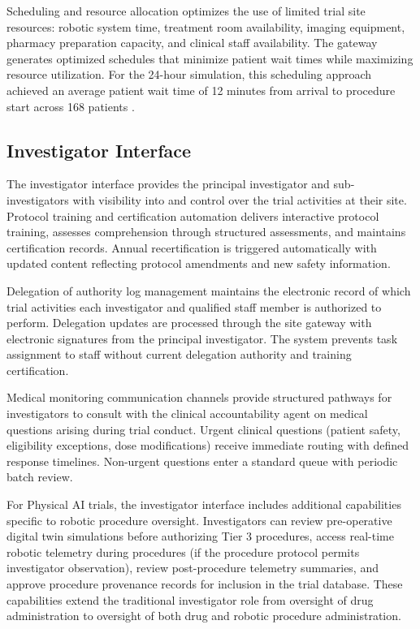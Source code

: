 Scheduling and resource allocation optimizes the use of limited trial site resources:
robotic system time, treatment room availability, imaging equipment, pharmacy preparation
capacity, and clinical staff availability. The gateway generates optimized schedules that
minimize patient wait times while maximizing resource utilization. For the 24-hour
simulation, this scheduling approach achieved an average patient wait time of 12 minutes
from arrival to procedure start across 168 patients \cite{main-repo}.

\subsection{Investigator Interface}

The investigator interface provides the principal investigator and sub-investigators with
visibility into and control over the trial activities at their site. Protocol training and
certification automation delivers interactive protocol training, assesses comprehension
through structured assessments, and maintains certification records. Annual recertification
is triggered automatically with updated content reflecting protocol amendments and new
safety information.

Delegation of authority log management maintains the electronic record of which trial
activities each investigator and qualified staff member is authorized to perform.
Delegation updates are processed through the site gateway with electronic signatures from
the principal investigator. The system prevents task assignment to staff without current
delegation authority and training certification.

Medical monitoring communication channels provide structured pathways for investigators to
consult with the clinical accountability agent on medical questions arising during trial
conduct. Urgent clinical questions (patient safety, eligibility exceptions, dose
modifications) receive immediate routing with defined response timelines. Non-urgent
questions enter a standard queue with periodic batch review.

For Physical AI trials, the investigator interface includes additional capabilities specific
to robotic procedure oversight. Investigators can review pre-operative digital twin
simulations before authorizing Tier 3 procedures, access real-time robotic telemetry during
procedures (if the procedure protocol permits investigator observation), review post-procedure
telemetry summaries, and approve procedure provenance records for inclusion in the trial
database. These capabilities extend the traditional investigator role from oversight of drug
administration to oversight of both drug and robotic procedure administration.

